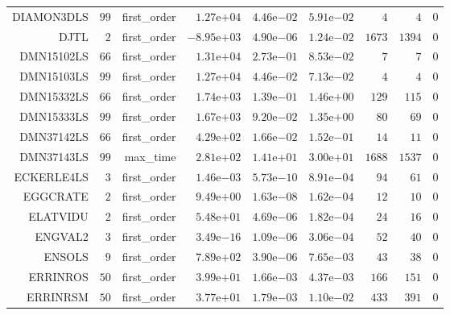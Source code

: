 \begin{longtable}{rrrrrrrrr}
DIAMON3DLS & \(    99\) & first\_order & \( 1.27\)e\(+04\) & \( 4.46\)e\(-02\) & \( 5.91\)e\(-02\) & \(     4\) & \(     4\) & \(     0\) \\
DJTL & \(     2\) & first\_order & \(-8.95\)e\(+03\) & \( 4.90\)e\(-06\) & \( 1.24\)e\(-02\) & \(  1673\) & \(  1394\) & \(     0\) \\
DMN15102LS & \(    66\) & first\_order & \( 1.31\)e\(+04\) & \( 2.73\)e\(-01\) & \( 8.53\)e\(-02\) & \(     7\) & \(     7\) & \(     0\) \\
DMN15103LS & \(    99\) & first\_order & \( 1.27\)e\(+04\) & \( 4.46\)e\(-02\) & \( 7.13\)e\(-02\) & \(     4\) & \(     4\) & \(     0\) \\
DMN15332LS & \(    66\) & first\_order & \( 1.74\)e\(+03\) & \( 1.39\)e\(-01\) & \( 1.46\)e\(+00\) & \(   129\) & \(   115\) & \(     0\) \\
DMN15333LS & \(    99\) & first\_order & \( 1.67\)e\(+03\) & \( 9.20\)e\(-02\) & \( 1.35\)e\(+00\) & \(    80\) & \(    69\) & \(     0\) \\
DMN37142LS & \(    66\) & first\_order & \( 4.29\)e\(+02\) & \( 1.66\)e\(-02\) & \( 1.52\)e\(-01\) & \(    14\) & \(    11\) & \(     0\) \\
DMN37143LS & \(    99\) & max\_time & \( 2.81\)e\(+02\) & \( 1.41\)e\(+01\) & \( 3.00\)e\(+01\) & \(  1688\) & \(  1537\) & \(     0\) \\
ECKERLE4LS & \(     3\) & first\_order & \( 1.46\)e\(-03\) & \( 5.73\)e\(-10\) & \( 8.91\)e\(-04\) & \(    94\) & \(    61\) & \(     0\) \\
EGGCRATE & \(     2\) & first\_order & \( 9.49\)e\(+00\) & \( 1.63\)e\(-08\) & \( 1.62\)e\(-04\) & \(    12\) & \(    10\) & \(     0\) \\
ELATVIDU & \(     2\) & first\_order & \( 5.48\)e\(+01\) & \( 4.69\)e\(-06\) & \( 1.82\)e\(-04\) & \(    24\) & \(    16\) & \(     0\) \\
ENGVAL2 & \(     3\) & first\_order & \( 3.49\)e\(-16\) & \( 1.09\)e\(-06\) & \( 3.06\)e\(-04\) & \(    52\) & \(    40\) & \(     0\) \\
ENSOLS & \(     9\) & first\_order & \( 7.89\)e\(+02\) & \( 3.90\)e\(-06\) & \( 7.65\)e\(-03\) & \(    43\) & \(    38\) & \(     0\) \\
ERRINROS & \(    50\) & first\_order & \( 3.99\)e\(+01\) & \( 1.66\)e\(-03\) & \( 4.37\)e\(-03\) & \(   166\) & \(   151\) & \(     0\) \\
ERRINRSM & \(    50\) & first\_order & \( 3.77\)e\(+01\) & \( 1.79\)e\(-03\) & \( 1.10\)e\(-02\) & \(   433\) & \(   391\) & \(     0\) \\

\end{longtable}
